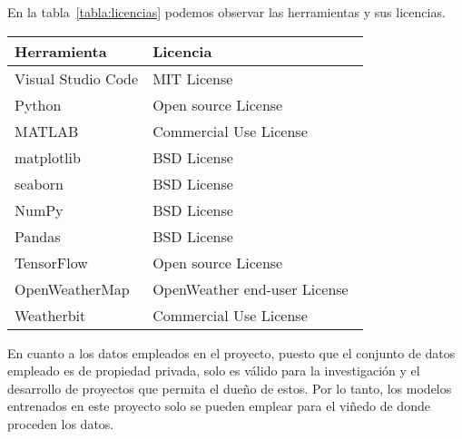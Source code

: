 \par

En la tabla~\ref{tabla:licencias} podemos observar las herramientas y sus licencias.

\begin{center}
\begin{tabular}{ |l| l| } 
 \hline
 \textbf{Herramienta} & \textbf{Licencia} \\ 
 \hline
 Visual Studio Code & MIT License  \\ 
 \hline
 Python & Open source License  \\ 
 \hline
 MATLAB & Commercial Use License\\
 \hline
 matplotlib & BSD License  \\ 
 \hline
 seaborn & BSD License\\
 \hline
 NumPy & BSD License\\
 \hline
 Pandas & BSD License  \\ 
 \hline
 TensorFlow & Open source License  \\ 
 \hline
 OpenWeatherMap & OpenWeather end-user License~\cite{licencia:OpenWeather}\\
 \hline
 Weatherbit & Commercial Use License\\
 \hline
\end{tabular}
\label{tabla:licencias}
\end{center}

\par

En cuanto a los datos empleados en el proyecto, puesto que el conjunto de datos empleado es de propiedad privada, solo es válido para la investigación y el desarrollo de proyectos que permita el dueño de estos. Por lo tanto, los modelos entrenados en este proyecto solo se pueden emplear para el viñedo de donde proceden los datos.
